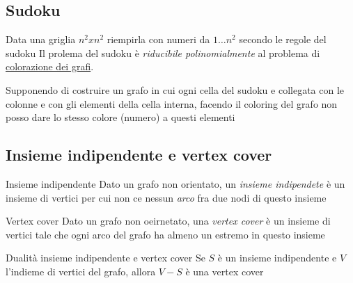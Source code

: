 \subsection{Sudoku}
Data una griglia $ n^2 x n^2  $ riempirla con numeri da $ 1\ldots n^2  $ secondo le regole del sudoku
\vskip3mm
Il prolema del sudoku è \textit{riducibile polinomialmente} al problema di \hyperref[problema colorazione]{colorazione dei grafi}.
\begin{center}
\end{center}
Supponendo di costruire un grafo in cui ogni cella del sudoku e collegata con le colonne e con gli elementi della cella interna, facendo il coloring del grafo non posso dare lo stesso colore (numero) a questi elementi
\subsection{Insieme indipendente e vertex cover}\label{insieme indipendente}
\begin{definizione}{Insieme indipendente}
	Dato un grafo non orientato, un \textit{insieme indipendete} è un insieme di vertici per cui non ce nessun \textit{arco} fra due nodi di questo insieme
\end{definizione}
\begin{definizione}{Vertex cover}
	Dato un grafo non oeirnetato, una \textit{vertex cover} è un insieme di vertici tale che ogni arco del grafo ha almeno un estremo in questo insieme
\end{definizione}
\begin{teorema}{Dualità insieme indipendente e vertex cover}
	Se $ S $ è un insieme indipendente e $ V $ l'indieme di vertici del grafo, allora $ V-S $ è una vertex cover
\end{teorema}
